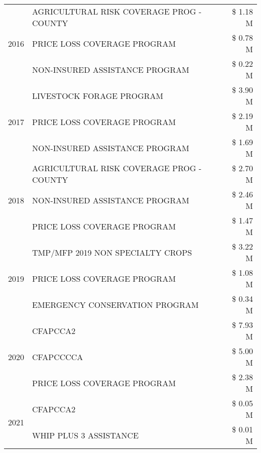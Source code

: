 \begin{tabular}{llr}
\cline{1-3}
\multirow[t]{3}{*}{2016} & AGRICULTURAL RISK COVERAGE PROG - COUNTY & \$ 1.18 M \\
 & PRICE LOSS COVERAGE PROGRAM & \$ 0.78 M \\
 & NON-INSURED ASSISTANCE PROGRAM & \$ 0.22 M \\
\cline{1-3}
\multirow[t]{3}{*}{2017} & LIVESTOCK FORAGE PROGRAM & \$ 3.90 M \\
 & PRICE LOSS COVERAGE PROGRAM & \$ 2.19 M \\
 & NON-INSURED ASSISTANCE PROGRAM & \$ 1.69 M \\
\cline{1-3}
\multirow[t]{3}{*}{2018} & AGRICULTURAL RISK COVERAGE PROG - COUNTY & \$ 2.70 M \\
 & NON-INSURED ASSISTANCE PROGRAM & \$ 2.46 M \\
 & PRICE LOSS COVERAGE PROGRAM & \$ 1.47 M \\
\cline{1-3}
\multirow[t]{3}{*}{2019} & TMP/MFP 2019 NON SPECIALTY CROPS & \$ 3.22 M \\
 & PRICE LOSS COVERAGE PROGRAM & \$ 1.08 M \\
 & EMERGENCY CONSERVATION PROGRAM & \$ 0.34 M \\
\cline{1-3}
\multirow[t]{3}{*}{2020} & CFAPCCA2 & \$ 7.93 M \\
 & CFAPCCCCA & \$ 5.00 M \\
 & PRICE LOSS COVERAGE PROGRAM & \$ 2.38 M \\
\cline{1-3}
\multirow[t]{2}{*}{2021} & CFAPCCA2 & \$ 0.05 M \\
 & WHIP PLUS 3 ASSISTANCE & \$ 0.01 M \\
\cline{1-3}
\bottomrule
\end{tabular}
